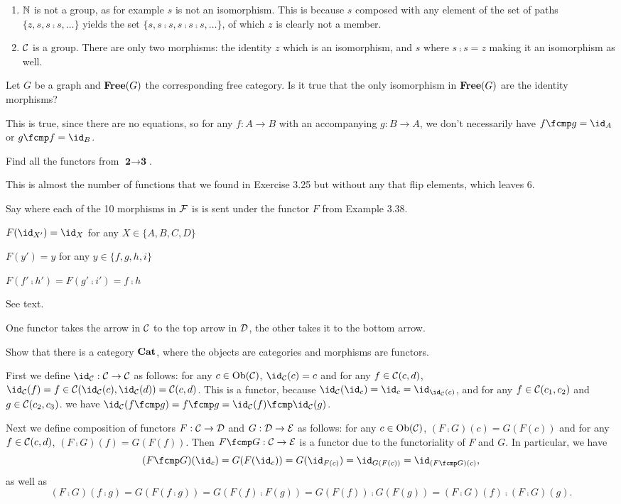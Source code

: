 \solution
\begin{enumerate}
	\item $\mathbb{N}$ is not a group, as for example $s$ is not an isomorphism.  This is because $s$ composed with any element of the set of paths $\{z,s, s\fcmp s,\dots\}$ yields the set $\{s, s\fcmp s, s\fcmp s\fcmp s,\dots\}$, of which $z$ is clearly not a member.
	\item $\mathcal{C}$ is a group.  There are only two morphisms: the identity $z$ which is an isomorphism, and $s$ where $s\fcmp s=z$ making it an isomorphism as well.
\end{enumerate}

Let $G$ be a graph and $\textbf{Free}(G)$ the corresponding free category.  Is it true that the only isomorphism in $\textbf{Free}(G)$ are the identity morphisms?

\solution
This is true, since there are no equations, so for any $f:A\to B$ with an accompanying $g:B\to A$, we don't necessarily have $f\fcmp g=\id_A$ or $g\fcmp f=\id_B$.

Find all the functors from $\textbf{2}\to\textbf{3}$.

\solution
This is almost the number of functions that we found in Exercise 3.25 but without any that flip elements, which leaves 6.

Say where each of the 10 morphisms in $\mathcal{F}$ is is sent under the functor $F$ from Example 3.38.

\solution
$F(\id_{X'})=\id_{X}$ for any $X\in\{A,B,C,D\}$

$F(y')=y$ for any $y\in\{f,g,h,i\}$

$F(f'\fcmp h')=F(g'\fcmp i')=f\fcmp h$

See text.

\solution
One functor takes the arrow in $\mathcal{C}$ to the top arrow in $\mathcal{D}$, the other takes it to the bottom arrow.

Show that there is a category $\textbf{Cat}$, where the objects are categories and morphisms are functors.

\solution
First we define $\id_\mcC:\mcC\to\mcC$ as follows: for any $c\in\textrm{Ob}(\mathcal{C})$, $\id_\mcC(c)=c$ and for any $f\in\mathcal{C}(c,d)$, $\id_\mcC(f)=f\in\mcC(\id_\mcC(c),\id_\mcC(d))=\mcC(c,d)$.  This is a functor, because $\id_\mcC(\id_c) = \id_c=\id_{\id_\mcC(c)}$, and for any $f\in\mathcal{C}(c_1,c_2)$ and $g\in\mathcal{C}(c_2,c_3)$. we have $\id_\mcC(f\fcmp g)=f\fcmp g = \id_\mcC(f)\fcmp\id_\mcC(g)$.

Next we define composition of functors $F:\mathcal{C}\to\mathcal{D}$ and $G:\mathcal{D}\to\mathcal{E}$ as follows: for any $c\in\textrm{Ob}(\mathcal{C})$, $(F\fcmp G)(c) = G(F(c))$ and for any $f\in\mathcal{C}(c,d)$, $(F\fcmp G)(f) = G(F(f))$.  Then $F\fcmp G:\mcC\to\mcE$ is a functor due to the functoriality of $F$ and $G$.  In particular, we have
$$(F\fcmp G)(\id_c)=G(F(\id_c))=G(\id_{F(c)})=\id_{G(F(c))}=\id_{(F\fcmp G)(c)},$$
as well as
$$(F\fcmp G)(f\fcmp g)=G(F(f\fcmp g)) = G(F(f)\fcmp F(g)) = G(F(f))\fcmp G(F(g)) = (F\fcmp G)(f)\fcmp (F\fcmp G)(g).$$

